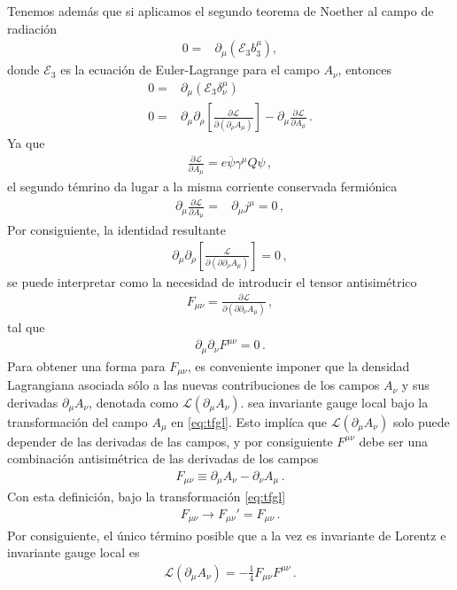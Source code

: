 \begin{frame}
Tenemos además que si aplicamos el segundo teorema de Noether al campo de radiación
\begin{align}
  0=&\partial_{\mu} \left( \mathcal{E}_3 b^{\mu}_3 \right),
\end{align}
donde $\mathcal{E}_3$ es la ecuación de Euler-Lagrange para el campo $A_{\nu}$,
entonces
\begin{align}
     0=&\partial_{\mu} \left( \mathcal{E}_3 \delta^{\mu}_\nu \right) \nonumber\\
    0=&
 \partial_{\mu} \partial_{\rho}\left[ \frac{\partial \mathcal{L}}{\partial \left(  \partial_{\rho} A_{\mu}\right)}  \right] - \partial_{\mu} \frac{\partial \mathcal{L}}{\partial A_{\mu}} \,.
\end{align}
Ya que
\begin{align}
  \frac{\partial \mathcal{L}}{\partial A_{\mu}}=e\overline{\psi}\gamma^{\mu} Q \psi\,,
\end{align}
el segundo témrino da lugar a la misma corriente conservada fermiónica
\begin{align}
  \partial_{\mu} \frac{\partial \mathcal{L}}{\partial A_{\mu}}=&
\partial_{\mu} j^{\mu}=0\,,
\end{align}
Por consiguiente, la identidad resultante
\begin{align}
   \partial_{\mu} \partial_{\rho}\left[ \frac{ \mathcal{L}}{\partial \left(\partial  \partial_{\rho} A_{\mu}\right)}  \right]=0\,,
\end{align}
se puede interpretar como la necesidad de introducir el tensor antisimétrico
\begin{align}
  F_{\mu\nu}=\frac{\partial \mathcal{L}}{\partial \left(\partial  \partial_{\nu} A_{\mu}\right)}\,,
\end{align}
tal que
\begin{align}
  \partial_{\mu}\partial_{\nu}F^{\mu\nu}=0\,.
\end{align}
Para obtener una forma para $F_{\mu\nu}$, es conveniente imponer que la densidad Lagrangiana asociada sólo a las nuevas contribuciones de los campos $A_{\nu}$ y sus derivadas $\partial_{\mu}A_{\nu}$, denotada como $\mathcal{L}\left( \partial_{\mu}A_{\nu}\right)$.
sea invariante gauge local bajo la transformación del campo $A_{\mu}$ en \eqref{eq:tfgl}. Esto implíca que $\mathcal{L}\left( \partial_{\mu}A_{\nu}\right)$  solo puede depender de las derivadas de las campos, y por consiguiente $F^{\mu\nu}$ debe ser una combinación antisimétrica de las derivadas de los campos
\begin{align}
  F_{\mu\nu}\equiv\partial_{\mu}A_{\nu}-\partial_{\nu}A_{\mu}\,.
\end{align}
Con esta definición, bajo la transformación  \eqref{eq:tfgl}
\begin{align}
  F_{\mu\nu}\to F_{\mu\nu}'=F_{\mu\nu}\,.
\end{align}
Por consiguiente, el único término posible que a la vez es invariante de Lorentz e invariante gauge local es
\begin{align}
 \mathcal{L}\left( \partial_{\mu}A_{\nu}\right)=-\frac{1}{4}F_{\mu\nu}F^{\mu\nu}\,.
\end{align}



\end{frame}
